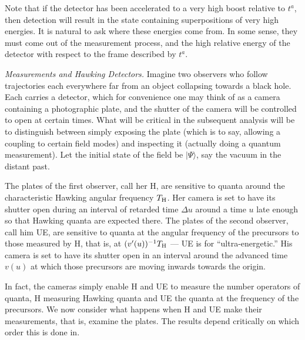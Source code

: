 \documentclass[
%
draft    %
,numberedheadings 
,bibliocites
  ]
  {aipproc}
\begin{document}
Note that if the detector has been accelerated to a very high boost relative to $t^a$, then detection will result in the state containing superpositions of very high energies.  It is natural to ask where these energies come from.  In some sense, they must come out of the measurement process, and the high relative energy of the detector with respect to the frame described by $t^a$.  


{\em Measurements and Hawking Detectors.}
Imagine two observers who follow trajectories each everywhere far from an object collapsing towards a black hole.  Each carries a detector, which for convenience one may think of as a camera containing a photographic plate, and the shutter of the camera will be controlled to open at certain times.  What will be critical in the subsequent analysis will be to distinguish between simply exposing the plate (which is to say, allowing a coupling to certain field modes) and inspecting it (actually doing a quantum measurement).  Let the initial state of the field be $|\Psi\rangle$, say the vacuum in the distant past.

The plates of the first observer, call her H, are sensitive to quanta around the characteristic Hawking angular frequency $T_{\rm H}$.  Her camera is set to have its shutter open during an interval of retarded time $\Delta u$ around a time $u$ late enough so that Hawking quanta are expected there.  
The plates of the second observer, call him UE, are sensitive to quanta at the angular frequency of the precursors to those measured by H, that is, at $(v'(u))^{-1}T_{\rm H}$  --- UE is for ``ultra-energetic.''  His camera is set to have its shutter open in an interval around the advanced time $v(u)$ at which those precursors are moving inwards towards the origin.



In fact, the cameras simply enable H and UE to measure the number operators of quanta, H measuring Hawking quanta and UE the quanta at the frequency of the precursors.
We now consider what happens when H and UE make their measurements, that is, examine the plates.  The results depend critically on which order this is done in.
\end{document}
